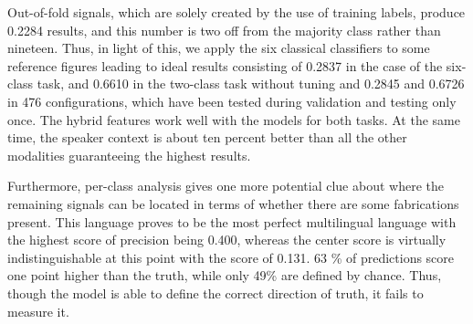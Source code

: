 \documentclass[10pt,twocolumn,twoside,a4paper]{article}
\begin{document}
Out-of-fold signals, which are solely created by the use of training labels, produce 0.2284 results, and this number is two off from the majority class rather than nineteen. Thus, in light of this, we apply the six classical classifiers to some reference figures leading to ideal results consisting of 0.2837 in the case of the six-class task, and 0.6610 in the two-class task without tuning and 0.2845 and 0.6726 in 476 configurations, which have been tested during validation and testing only once. The hybrid features work well with the models for both tasks. At the same time, the speaker context is about ten percent better than all the other modalities guaranteeing the highest results.

Furthermore, per-class analysis gives one more potential clue about where the remaining signals can be located in terms of whether there are some fabrications present. This language proves to be the most perfect multilingual language with the highest score of precision being 0.400, whereas the center score is virtually indistinguishable at this point with the score of 0.131. 63 \% of predictions score one point higher than the truth, while only 49\% are defined by chance. Thus, though the model is able to define the correct direction of truth, it fails to measure it.
\end{document}

